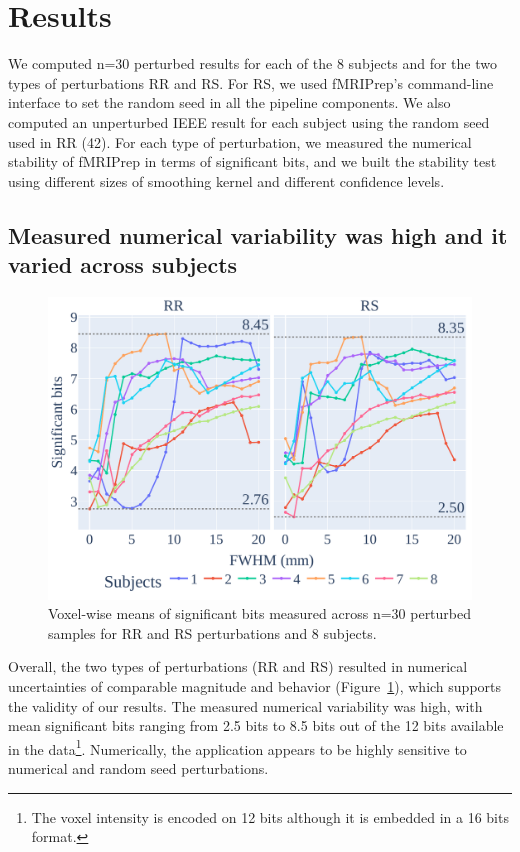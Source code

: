 \documentclass[lettersize,journal]{IEEEtran}
\newcommand{\fmriprep}{fMRIPrep\xspace}
\begin{document}
\section{Results}

We computed n=30 perturbed results for each of the 8 subjects and for the two types of perturbations RR and RS. For RS, we used \fmriprep's command-line interface to set the random seed in all the pipeline components. We also computed an unperturbed IEEE result for each subject using the random seed used in RR (42). For each type of perturbation, we measured the numerical stability of fMRIPrep in terms of significant bits, and we built the stability test using different sizes of smoothing kernel and different confidence levels.

\subsection{Measured numerical variability was high and it varied across subjects}

\begin{figure}
  \centering
  \includegraphics[width=\linewidth]{figures/stats.pdf}
  \caption{Voxel-wise means of significant bits
    measured across n=30 perturbed samples for RR and RS perturbations and 8
    subjects.}
  \label{fig:significant-digits}
\end{figure}
Overall, the two types of perturbations (RR and RS) resulted in numerical uncertainties of comparable magnitude and behavior (Figure~\ref{fig:significant-digits}), which supports the validity of our results. The measured numerical variability was high, with mean significant bits ranging from 2.5 bits to 8.5 bits out of the 12 bits available in the data\footnote{The voxel intensity is encoded on 12 bits although it is embedded in a 16 bits format.}. Numerically, the application appears to be highly sensitive to numerical and random seed perturbations.
\end{document}
